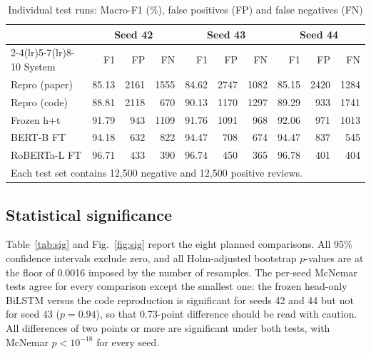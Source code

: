 \documentclass[conference]{IEEEtran}
\begin{document}
\begin{table}[t]
\caption{Individual test runs: Macro-F1 (\%), false positives (FP) and false negatives (FN)}
\label{tab:seeds}
\centering
\footnotesize
\setlength{\tabcolsep}{2.2pt}
\begin{tabular}{lrrrrrrrrr}
\toprule
 & \multicolumn{3}{c}{Seed 42} & \multicolumn{3}{c}{Seed 43} & \multicolumn{3}{c}{Seed 44} \\
\cmidrule(lr){2-4}\cmidrule(lr){5-7}\cmidrule(lr){8-10}
System & F1 & FP & FN & F1 & FP & FN & F1 & FP & FN \\
\midrule
Repro (paper) & 85.13 & 2161 & 1555 & 84.62 & 2747 & 1082 & 85.15 & 2420 & 1284 \\
Repro (code) & 88.81 & 2118 & 670 & 90.13 & 1170 & 1297 & 89.29 & 933 & 1741 \\
Frozen h+t & 91.79 & 943 & 1109 & 91.76 & 1091 & 968 & 92.06 & 971 & 1013 \\
BERT-B FT & 94.18 & 632 & 822 & 94.47 & 708 & 674 & 94.47 & 837 & 545 \\
RoBERTa-L FT & 96.71 & 433 & 390 & 96.74 & 450 & 365 & 96.78 & 401 & 404 \\
\bottomrule
\multicolumn{10}{l}{\scriptsize Each test set contains 12{,}500 negative and 12{,}500 positive reviews.}
\end{tabular}
\end{table}

\subsection{Statistical significance}
Table~\ref{tab:sig} and Fig.~\ref{fig:sig} report the eight planned comparisons. All 95\% confidence intervals exclude zero, and all Holm-adjusted bootstrap $p$-values are at the floor of 0.0016 imposed by the number of resamples. The per-seed McNemar tests agree for every comparison except the smallest one: the frozen head-only BiLSTM versus the code reproduction is significant for seeds 42 and 44 but not for seed 43 ($p=0.94$), so that 0.73-point difference should be read with caution. All differences of two points or more are significant under both tests, with McNemar $p<10^{-18}$ for every seed.
\end{document}
